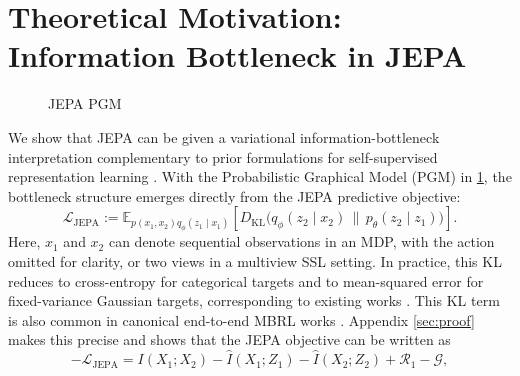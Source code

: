 \documentclass{article}
\newcommand{\E}{\mathbb{E}}
\newcommand{\KL}{D_{\mathrm{KL}}}
\begin{document}
\section{Theoretical Motivation: Information Bottleneck in JEPA}
\label{sec:theory}
\begin{figure}
    \vspace{-10pt}
    \centering
    \caption{JEPA PGM}
    \label{fig:jepa_pgm}

\end{figure}
We show that JEPA can be given a variational information-bottleneck interpretation \citep{shwartz2017opening,tishby2000information, alemi2016deepVarIB} complementary to prior formulations for self-supervised representation learning \citep{2023multiviewJepa, shwartz2024compress}. With the Probabilistic Graphical Model (PGM) in \cref{fig:jepa_pgm}, the bottleneck structure emerges directly from the JEPA predictive objective:
\begin{equation}
\mathcal L_{\mathrm{JEPA}} := \E_{p(x_1,x_2)q_\phi(z_1\mid x_1)}\!\left[\KL\bigl(q_\phi(z_2\mid x_2)\,\|\,p_\theta(z_2\mid z_1)\bigr)\right].
\label{eq:jepa_loss}
\end{equation}
Here, $x_1$ and $x_2$ can denote sequential observations in an MDP, with the action omitted for clarity, or two views in a multiview SSL setting. In practice, this KL reduces to cross-entropy for categorical targets and to mean-squared error for fixed-variance Gaussian targets, corresponding to existing works \citep{caron2021DINO, assran2023I-JEPA}. This KL term is also common in canonical end-to-end MBRL works \citep{Hafner2020Dreamer,hafner2020Dreamerv2, hafner2023Dreamerv3, hansen2022TDMPC, hansen2023tdmpc2}. Appendix \ref{sec:proof} makes this precise and shows that the JEPA objective can be written as
\begin{equation}
-\mathcal L_{\mathrm{JEPA}} = I(X_1;X_2) - \widehat I(X_1;Z_1) - \widehat I(X_2;Z_2) + \mathcal R_1 - \mathcal G,
\label{eq:main_jepa_ib}
\end{equation}
\end{document}
